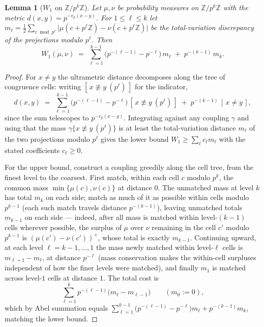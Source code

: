 \documentclass[11pt]{amsart}
\newtheorem{lemma}[theorem]{Lemma}
\theoremstyle{definition}
\theoremstyle{remark}
\newcommand{\Z}{\mathbb{Z}}
\newcommand{\dW}{W_1}
\begin{document}
\begin{lemma}[$\dW$ on $\Z/p^k\Z$]\label{lem:w1formula}
Let $\mu,\nu$ be probability measures on $\Z/p^k\Z$ with the metric $d(x,y) = p^{-v_p(x-y)}$. For $1 \le \ell \le k$ let $m_\ell = \tfrac12 \sum_{c \bmod p^\ell} \bigl|\mu(c + p^\ell\Z) - \nu(c + p^\ell\Z)\bigr|$ be the total-variation discrepancy of the projections modulo $p^\ell$. Then
\[
\dW(\mu,\nu) \;=\; \sum_{\ell=1}^{k-1} \bigl(p^{-(\ell-1)} - p^{-\ell}\bigr)\, m_\ell \;+\; p^{-(k-1)}\, m_k .
\]
\end{lemma}

\begin{proof}
For $x \neq y$ the ultrametric distance decomposes along the tree of congruence cells: writing $[\,x \not\equiv y \ (p^\ell)\,]$ for the indicator,
\[
d(x,y) \;=\; \sum_{\ell=1}^{k-1} \bigl(p^{-(\ell-1)} - p^{-\ell}\bigr)\, [\,x \not\equiv y\ (p^\ell)\,] \;+\; p^{-(k-1)}\,[\,x \neq y\,],
\]
since the sum telescopes to $p^{-v_p(x-y)}$. Integrating against any coupling $\gamma$ and using that the mass $\gamma\{x \not\equiv y \ (p^\ell)\}$ is at least the total-variation distance $m_\ell$ of the two projections modulo $p^\ell$ gives the lower bound $\dW \ge \sum_\ell c_\ell m_\ell$ with the stated coefficients $c_\ell \ge 0$.

For the upper bound, construct a coupling greedily along the cell tree, from the finest level to the coarsest. First match, within each cell $c$ modulo $p^k$, the common mass $\min\{\mu(c), \nu(c)\}$ at distance $0$. The unmatched mass at level $k$ has total $m_k$ on each side; match as much of it as possible within cells modulo $p^{k-1}$ (each such match travels distance $p^{-(k-1)}$), leaving unmatched totals $m_{k-1}$ on each side --- indeed, after all mass is matched within level-$(k-1)$ cells wherever possible, the surplus of $\mu$ over $\nu$ remaining in the cell $c'$ modulo $p^{k-1}$ is $(\mu(c') - \nu(c'))^+$, whose total is exactly $m_{k-1}$. Continuing upward, at each level $\ell = k-1, \dots, 1$ the mass newly matched within level-$\ell$ cells is $m_{\ell+1} - m_\ell$, at distance $p^{-\ell}$ (mass conservation makes the within-cell surpluses independent of how the finer levels were matched), and finally $m_1$ is matched across level-$1$ cells at distance $1$. The total cost is
\[
\sum_{\ell=1}^{k} p^{-(\ell-1)} \bigl(m_\ell - m_{\ell-1}\bigr) \qquad (m_0 := 0),
\]
which by Abel summation equals $\sum_{\ell=1}^{k-1} \bigl(p^{-(\ell-1)} - p^{-\ell}\bigr) m_\ell + p^{-(k-1)} m_k$, matching the lower bound.
\end{proof}
\end{document}
